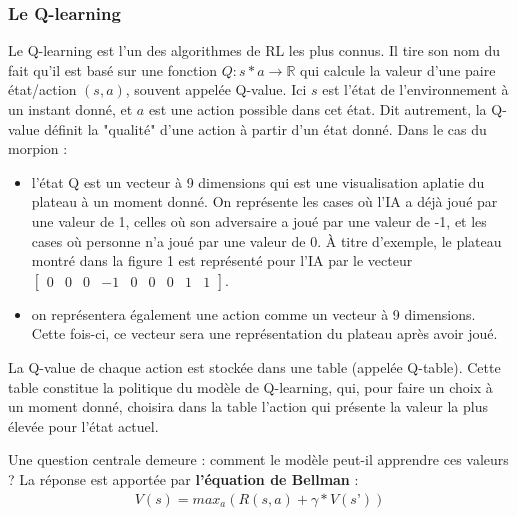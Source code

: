 \documentclass[french]{article}
\begin{document}
    \subsubsection{Le Q-learning}
    Le Q-learning \cite{Q-learning} est l'un des algorithmes de RL les plus connus. Il tire son nom du fait qu'il est basé sur une fonction $Q:s * a \rightarrow \mathbb{R}$ qui calcule la valeur d'une paire état/action $(s, a)$, souvent appelée Q-value. Ici $s$ est l'état de l'environnement à un instant donné, et $a$ est une action possible dans cet état. Dit autrement, la Q-value définit la "qualité" d'une action à partir d'un état donné. Dans le cas du morpion :
    \begin{itemize}
        \item l'état Q est un vecteur à 9 dimensions qui est une visualisation aplatie du plateau à un moment donné. On représente les cases où l'IA a déjà joué par une valeur de 1, celles où son adversaire a joué par une valeur de -1, et les cases où personne n'a joué par une valeur de 0. À titre d'exemple, le plateau montré dans la figure 1 est représenté pour l'IA par le vecteur $\begin{bmatrix}0&0&0&-1&0&0&0&1&1\end{bmatrix}$.
        \item on représentera également une action comme un vecteur à 9 dimensions. Cette fois-ci, ce vecteur sera une représentation du plateau après avoir joué.
    \end{itemize}

    La Q-value de chaque action est stockée dans une table (appelée Q-table). Cette table constitue la politique du modèle de Q-learning, qui, pour faire un choix à un moment donné, choisira dans la table l'action qui présente la valeur la plus élevée pour l'état actuel.

    Une question centrale demeure : comment le modèle peut-il apprendre ces valeurs ? La réponse est apportée par \textbf{l'équation de Bellman} :
    \begin{align*} 
        V(s)=max_a(R(s,a)+ \gamma*V(s’))
    \end{align*}
    
\end{document}
